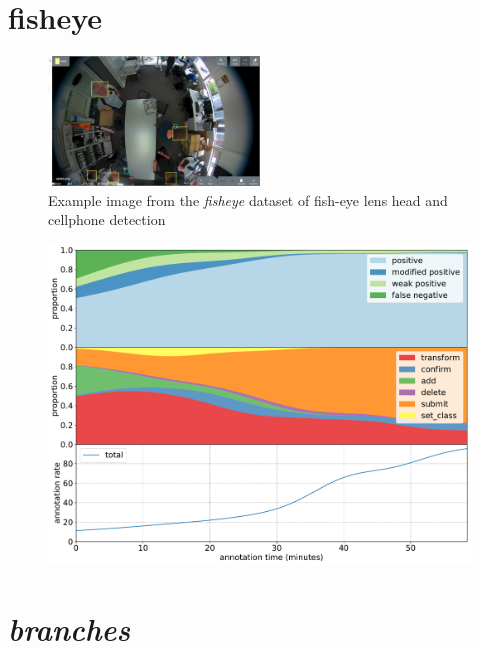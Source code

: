 \pagebreak
\section{fisheye}

\begin{figure}[H]
\begin{center}
  \includegraphics[width=0.5\textwidth]{figures/annotation/screenshots/victor.png}
\end{center}
  \caption{Example image from the \emph{fisheye} dataset of fish-eye lens head and cellphone detection }
\end{figure}

\begin{figure}[!h]
\centering
\includegraphics[width=1.0\linewidth]{charts/action_annotations/fisheye.pdf}
\caption{  }
\label{fig:fisheye_annotation}
\end{figure}


\pagebreak
\section{\emph{branches}}



